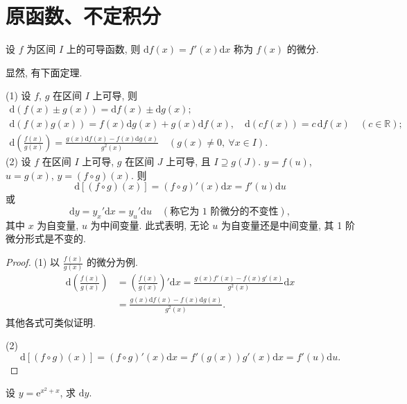 \section{原函数、不定积分}\label{sec:5.1}

\begin{definition}\label{def:5.1.1}
设 $f$ 为区间 $I$ 上的可导函数, 则 $\mathrm{d}f(x)=f'(x)\mathrm{d}x$ 称为 $f(x)$ 的微分.
\end{definition}

显然, 有下面定理.

\begin{theorem}\label{thm:5.1.1}
(1) 设 $f$, $g$ 在区间 $I$ 上可导, 则
\begin{gather*}
\mathrm{d}(f(x)\pm g(x))=\mathrm{d}f(x)\pm\mathrm{d}g(x);\\
\mathrm{d}(f(x)g(x))=f(x)\mathrm{d}g(x)+g(x)\mathrm{d}f(x),\quad
\mathrm{d}(cf(x))=c\,\mathrm{d}f(x)\quad (c\in\mathbb{R});\\
\mathrm{d}\left(\frac{f(x)}{g(x)}\right)=\frac{g(x)\mathrm{d}f(x)-f(x)\mathrm{d}g(x)}{g^{2}(x)}
\quad (g(x)\neq 0,\ \forall x\in I).
\end{gather*}
(2) 设 $f$ 在区间 $I$ 上可导, $g$ 在区间 $J$ 上可导, 且 $I\supseteq g(J)$. $y=f(u)$, $u=g(x)$, $y=(f\circ g)(x)$. 则
\[
\mathrm{d}\left[(f\circ g)(x)\right]=(f\circ g)'(x)\mathrm{d}x=f'(u)\mathrm{d}u
\]
或
\[
\mathrm{d}y=y_{x}'\mathrm{d}x=y_{u}'\mathrm{d}u \quad(\text{称它为 1 阶微分的不变性}),
\]
其中 $x$ 为自变量, $u$ 为中间变量. 此式表明, 无论 $u$ 为自变量还是中间变量, 其 1 阶微分形式是不变的.
\end{theorem}

\begin{proof}
(1) 以 $\frac{f(x)}{g(x)}$ 的微分为例.
\begin{align*}
\mathrm{d}\left(\frac{f(x)}{g(x)}\right)
&=\left(\frac{f(x)}{g(x)}\right)'\mathrm{d}x
=\frac{g(x)f'(x)-f(x)g'(x)}{g^{2}(x)}\mathrm{d}x\\
&=\frac{g(x)\mathrm{d}f(x)-f(x)\mathrm{d}g(x)}{g^{2}(x)}.
\end{align*}
其他各式可类似证明.

(2)
\[
\mathrm{d}\left[(f\circ g)(x)\right]=(f\circ g)'(x)\mathrm{d}x=f'\left(g(x)\right)g'(x)\mathrm{d}x=f'(u)\mathrm{d}u.
\]
\end{proof}

\begin{example}\label{ex:5.1.1}
设 $y=\mathrm{e}^{x^{2}+x}$, 求 $\mathrm{d}y$.
\end{example}

